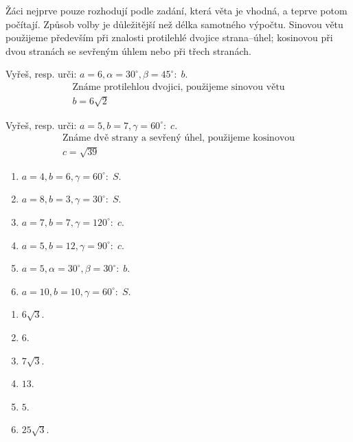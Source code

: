 \documentclass[11pt,a4paper]{article}
\begin{document}
Žáci nejprve pouze rozhodují podle zadání, která věta je vhodná, a teprve potom počítají. Způsob volby je důležitější než délka samotného výpočtu.
Sinovou větu použijeme především při znalosti protilehlé dvojice strana–úhel; kosinovou při dvou stranách se sevřeným úhlem nebo při třech stranách.
\begin{prikladReseniBox}[title={Příklad 1}]
Vyřeš, resp. urči: $a=6,\alpha=30^\circ,\beta=45^\circ:\;b$.
\tcblower
\[\begin{aligned}\text{Známe protilehlou dvojici, použijeme sinovou větu} \\ b=6\sqrt2\end{aligned}\]
\end{prikladReseniBox}
\begin{prikladReseniBox}[title={Příklad 2}]
Vyřeš, resp. urči: $a=5,b=7,\gamma=60^\circ:\;c$.
\tcblower
\[\begin{aligned}\text{Známe dvě strany a sevřený úhel, použijeme kosinovou} \\ c=\sqrt{39}\end{aligned}\]
\end{prikladReseniBox}
\begin{zadaniReseniBox}[title={Samostatná práce 1}]
\begin{enumerate}[label=\alph*)]
\item $a=4,b=6,\gamma=60^\circ:\;S$.
\item $a=8,b=3,\gamma=30^\circ:\;S$.
\item $a=7,b=7,\gamma=120^\circ:\;c$.
\item $a=5,b=12,\gamma=90^\circ:\;c$.
\item $a=5,\alpha=30^\circ,\beta=30^\circ:\;b$.
\item $a=10,b=10,\gamma=60^\circ:\;S$.
\end{enumerate}
\tcblower
\begin{enumerate}[label=\alph*)]
\item $6\sqrt3$.
\item $6$.
\item $7\sqrt3$.
\item $13$.
\item $5$.
\item $25\sqrt3$.
\end{enumerate}
\end{zadaniReseniBox}
\end{document}
